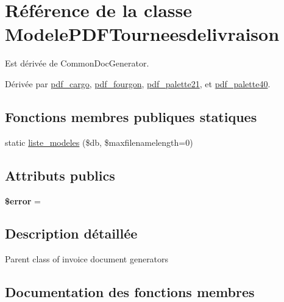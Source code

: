 \hypertarget{classModelePDFTourneesdelivraison}{}\section{Référence de la classe Modele\+P\+D\+F\+Tourneesdelivraison}
\label{classModelePDFTourneesdelivraison}


Est dérivée de Common\+Doc\+Generator.



Dérivée par \hyperlink{classpdf__cargo}{pdf\+\_\+cargo}, \hyperlink{classpdf__fourgon}{pdf\+\_\+fourgon}, \hyperlink{classpdf__palette21}{pdf\+\_\+palette21}, et \hyperlink{classpdf__palette40}{pdf\+\_\+palette40}.

\subsection*{Fonctions membres publiques statiques}
\begin{DoxyCompactItemize}
\item 
static \hyperlink{classModelePDFTourneesdelivraison_a93b421e318f690061302a46e05d64530}{liste\+\_\+modeles} (\$db, \$maxfilenamelength=0)
\end{DoxyCompactItemize}
\subsection*{Attributs publics}
\begin{DoxyCompactItemize}
\item 
\mbox{\label{classModelePDFTourneesdelivraison_ab6dcbc1afbe42917f7d0d57e871df602}} 
{\bfseries \$error} =\textquotesingle{}\textquotesingle{}
\end{DoxyCompactItemize}


\subsection{Description détaillée}
Parent class of invoice document generators 

\subsection{Documentation des fonctions membres}
\mbox{\label{classModelePDFTourneesdelivraison_a93b421e318f690061302a46e05d64530}} 
